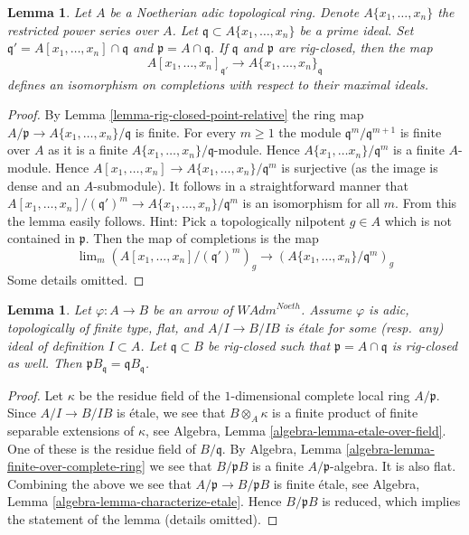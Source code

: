 \documentclass{stacks-project}
\theoremstyle{plain}
\newtheorem{lemma}[subsection]{Lemma}
\theoremstyle{definition}
\theoremstyle{remark}
\numberwithin{equation}{subsection}
\def\lim{\mathop{\mathrm{lim}}\nolimits}
\begin{document}
\begin{lemma}
\label{lemma-rig-closed-point-variables}
Let $A$ be a Noetherian adic topological ring. Denote $A\{x_1, \ldots, x_n\}$
the restricted power series over $A$. Let
$\mathfrak q \subset A\{x_1, \ldots, x_n\}$ be a prime ideal.
Set $\mathfrak q' = A[x_1, \ldots, x_n] \cap \mathfrak q$ and
$\mathfrak p = A \cap \mathfrak q$. If $\mathfrak q$ and $\mathfrak p$
are rig-closed, then the map
$$
A[x_1, \ldots, x_n]_{\mathfrak q'}
\to
A\{x_1, \ldots, x_n\}_\mathfrak q
$$
defines an isomorphism on completions with respect to their maximal ideals.
\end{lemma}

\begin{proof}
By Lemma \ref{lemma-rig-closed-point-relative} the ring map
$A/\mathfrak p \to A\{x_1, \ldots, x_n\}/\mathfrak q$ is finite.
For every $m \geq 1$ the module $\mathfrak q^m/\mathfrak q^{m + 1}$
is finite over $A$ as it is a finite
$A\{x_1, \ldots, x_n\}/\mathfrak q$-module.
Hence $A\{x_1, \ldots x_n\}/\mathfrak q^m$ is a finite $A$-module.
Hence $A[x_1, \ldots, x_n] \to A\{x_1, \ldots, x_n\}/\mathfrak q^m$
is surjective (as the image is dense and an $A$-submodule).
It follows in a straightforward manner that
$A[x_1, \ldots, x_n]/(\mathfrak q')^m \to A\{x_1, \ldots, x_n\}/\mathfrak q^m$
is an isomorphism for all $m$. From this the lemma easily follows.
Hint: Pick a topologically nilpotent $g \in A$ which is not contained
in $\mathfrak p$. Then the map of completions is the map
$$
\lim_m \left(A[x_1, \ldots, x_n]/(\mathfrak q')^m\right)_g
\longrightarrow
\left(A\{x_1, \ldots, x_n\}/\mathfrak q^m\right)_g
$$
Some details omitted.
\end{proof}

\begin{lemma}
\label{lemma-rig-closed-point-etale}
Let $\varphi : A \to B$ be an arrow of $\textit{WAdm}^{Noeth}$.
Assume $\varphi$ is adic, topologically of finite type, flat,
and $A/I \to B/IB$ is \'etale for some (resp.\ any)
ideal of definition $I \subset A$. Let $\mathfrak q \subset B$
be rig-closed such that $\mathfrak p = A \cap \mathfrak q$
is rig-closed as well. Then
$\mathfrak p B_\mathfrak q = \mathfrak q B_\mathfrak q$.
\end{lemma}

\begin{proof}
Let $\kappa$ be the residue field of the $1$-dimensional complete
local ring $A/\mathfrak p$. Since $A/I \to B/IB$ is \'etale, we see that
$B \otimes_A \kappa$ is a finite product of finite separable
extensions of $\kappa$, see
Algebra, Lemma \ref{algebra-lemma-etale-over-field}.
One of these is the residue field of $B/\mathfrak q$.
By Algebra, Lemma \ref{algebra-lemma-finite-over-complete-ring} we see that
$B/\mathfrak p B$ is a finite $A/\mathfrak p$-algebra.
It is also flat. Combining the above
we see that $A/\mathfrak p  \to B /\mathfrak p B$
is finite \'etale, see
Algebra, Lemma \ref{algebra-lemma-characterize-etale}.
Hence $B/\mathfrak p B$ is reduced, which implies the statement of
the lemma (details omitted).
\end{proof}
\end{document}

